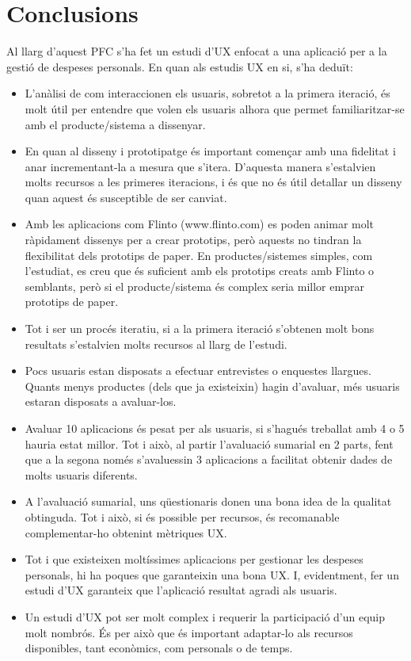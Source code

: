 \chapter{Conclusions}

Al llarg d'aquest \ac{PFC} s'ha fet un estudi d'\ac{UX} enfocat a una aplicació per a la gestió de despeses personals. En quan als estudis \ac{UX} en si, s'ha deduït:

\begin{itemize}
\item L'anàlisi de com interaccionen els usuaris, sobretot a la primera iteració, és molt útil per entendre que volen els usuaris alhora que permet familiaritzar-se amb el producte/sistema a dissenyar.
\item En quan al disseny i prototipatge és important començar amb una fidelitat i anar incrementant-la a mesura que s'itera. D'aquesta manera s'estalvien molts recursos a les primeres iteracions, i és que no és útil detallar un disseny quan aquest és susceptible de ser canviat. %
\item Amb les aplicacions com Flinto (www.flinto.com) es poden animar molt ràpidament dissenys per a crear prototips, però aquests no tindran la flexibilitat dels prototips de paper. En productes/sistemes simples, com l'estudiat, es creu que és suficient amb els prototips creats amb Flinto o semblants, però si el producte/sistema és complex seria millor emprar prototips de paper.
\item Tot i ser un procés iteratiu, si a la primera iteració s'obtenen molt bons resultats s'estalvien molts recursos al llarg de l'estudi. 
\item Pocs usuaris estan disposats a efectuar entrevistes o enquestes llargues. Quants menys productes (dels que ja existeixin) hagin d'avaluar, més usuaris estaran disposats a avaluar-los. 
\item Avaluar 10 aplicacions és pesat per als usuaris, si s'hagués treballat amb 4 o 5 hauria estat millor. Tot i això, al partir l'avaluació sumarial en 2 parts, fent que a la segona només s'avaluessin 3 aplicacions a facilitat obtenir dades de molts usuaris diferents. 
\item A l'avaluació sumarial, uns qüestionaris donen una bona idea de la qualitat obtinguda. Tot i això, si és possible per recursos, és recomanable complementar-ho obtenint mètriques \ac{UX}.
\item Tot i que existeixen moltíssimes aplicacions per gestionar les despeses personals, hi ha poques que garanteixin una bona \ac{UX}. I, evidentment, fer un estudi d'\ac{UX} garanteix que l'aplicació resultat agradi als usuaris. 
\item Un estudi d'\ac{UX} pot ser molt complex i requerir la participació d'un equip molt nombrós. És per això que és important adaptar-lo als recursos disponibles, tant econòmics, com personals o de temps. 
\end{itemize}

